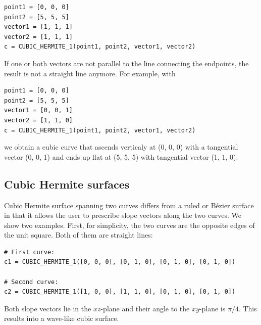 \begin{bbox}
\begin{verbatim}
point1 = [0, 0, 0]
point2 = [5, 5, 5]
vector1 = [1, 1, 1]
vector2 = [1, 1, 1]
c = CUBIC_HERMITE_1(point1, point2, vector1, vector2)
\end{verbatim}
\end{bbox}
\vspace{6mm}

\noindent
If one or both vectors are not parallel to the line connecting 
the endpoints, the result is not a straight line anymore. 
For example, with \\
 
\begin{bbox}
\begin{verbatim}
point1 = [0, 0, 0]
point2 = [5, 5, 5]
vector1 = [0, 0, 1]
vector2 = [1, 1, 0]
c = CUBIC_HERMITE_1(point1, point2, vector1, vector2)
\end{verbatim}
\end{bbox}
\vspace{6mm}

\noindent
we obtain a cubic curve that ascends verticaly at (0, 0, 0) with
a tangential vector (0, 0, 1) and ends up flat at (5, 5, 5) with 
tangential vector (1, 1, 0).

\subsection{Cubic Hermite surfaces}

Cubic Hermite surface 
spanning two curves differs from a ruled or B\'ezier surface in that 
it allows the user to prescribe slope vectors along the 
two curves. We show two examples. First, for simplicity,
the two curves are the opposite edges of the unit square. 
Both of them are straight lines:\\

\begin{bbox}
\begin{verbatim}
# First curve:
c1 = CUBIC_HERMITE_1([0, 0, 0], [0, 1, 0], [0, 1, 0], [0, 1, 0])

# Second curve:
c2 = CUBIC_HERMITE_1([1, 0, 0], [1, 1, 0], [0, 1, 0], [0, 1, 0])
\end{verbatim}
\end{bbox}
\vspace{6mm}

\noindent
Both slope vectors lie in the $xz$-plane and their angle to the $xy$-plane
is $\pi/4$. This results into a wave-like cubic surface.\\

